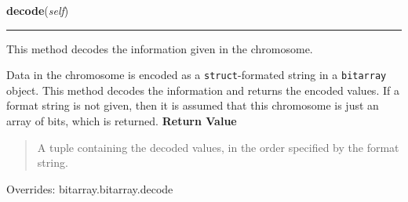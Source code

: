     \vspace{0.5ex}

\hspace{.8\funcindent}\begin{boxedminipage}{\funcwidth}

    \raggedright \textbf{decode}(\textit{self})

    \vspace{-1.5ex}

    \rule{\textwidth}{0.5\fboxrule}
\setlength{\parskip}{2ex}

This method decodes the information given in the chromosome.

Data in the chromosome is encoded as a \texttt{struct}-formated string in a
\texttt{bitarray} object. This method decodes the information and returns the
encoded values. If a format string is not given, then it is assumed that
this chromosome is just an array of bits, which is returned.
\setlength{\parskip}{1ex}
      \textbf{Return Value}
    \vspace{-1ex}

      \begin{quote}

A tuple containing the decoded values, in the order specified by the
format string.
      \end{quote}

      Overrides: bitarray.bitarray.decode

    \end{boxedminipage}

    \vspace{0.5ex}

